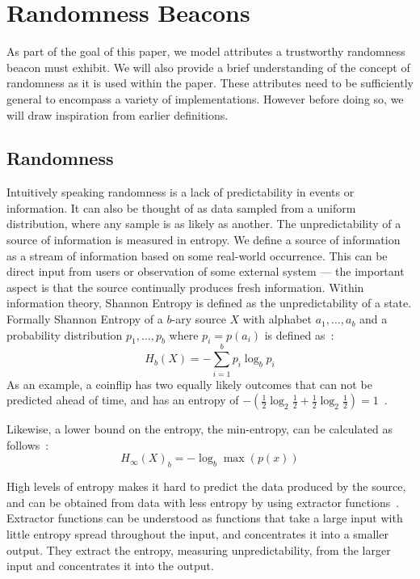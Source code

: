 \section{Randomness Beacons}\label{sec:beacons}

As part of the goal of this paper, we model attributes a trustworthy randomness beacon must exhibit.
We will also provide a brief understanding of the concept of randomness as it is used within the paper.
These attributes need to be sufficiently general to encompass a variety of implementations.
However before doing so, we will draw inspiration from earlier definitions.

\subsection{Randomness}\label{sub:beacons_randomness}

Intuitively speaking randomness is a lack of predictability in events or information. It can also be thought of as data sampled from a uniform distribution, where any sample is as likely as another. The unpredictability of a source of information is measured in entropy.
We define a source of information as a stream of information based on some real-world occurrence. This can be direct input from users or observation of some external system --- the important aspect is that the source continually  produces fresh information.
Within information theory, Shannon Entropy is defined as the unpredictability of a state.
Formally Shannon Entropy of a $b$-ary source $X$ with alphabet ${a_1, \ldots, a_b}$ and a probability distribution ${p_1, \ldots , p_b}$ where $p_i = p(a_i)$ is defined as~\cite{informationtheory}:
$$
H_{b} (X) = -\sum\limits_{i = 1}^b p_{i}\log_{b} p_{i}
$$
As an example, a coinflip has two equally likely outcomes that can not be predicted ahead of time, and has an entropy of $-(\frac{1}{2}\log_2 \frac{1}{2} + \frac{1}{2}\log_2 \frac{1}{2}) = 1$~\cite{informationtheory}.

Likewise, a lower bound on the entropy, the min-entropy, can be calculated as follows~\cite{informationtheory}:
$$
H_\infty(X)_{b} = -\log_{b}\max(p(x))
$$

High levels of entropy makes it hard to predict the data produced by the source, and can be obtained from data with less entropy by using extractor functions~\cite{pseudorandomness}. Extractor functions can be understood as functions that take a large input with little entropy spread throughout the input, and concentrates it into a smaller output. They extract the entropy, measuring unpredictability, from the larger input and concentrates it into the output.

